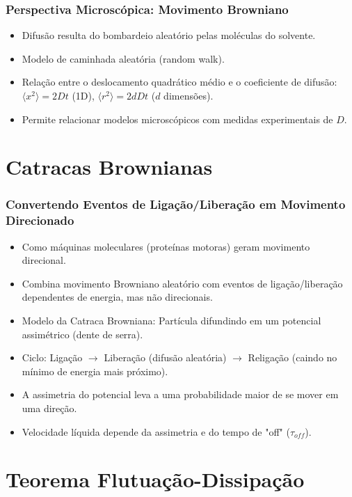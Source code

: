 \documentclass[11pt]{beamer}
\begin{document}
\begin{frame}
    \frametitle{Perspectiva Microscópica: Movimento Browniano}
    \begin{itemize}
        \item Difusão resulta do bombardeio aleatório pelas moléculas do solvente.
        \item Modelo de caminhada aleatória (random walk).
        \item Relação entre o deslocamento quadrático médio e o coeficiente de difusão: $\langle x^2 \rangle = 2Dt$ (1D), $\langle r^2 \rangle = 2dDt$ ($d$ dimensões).
        \item Permite relacionar modelos microscópicos com medidas experimentais de $D$.
    \end{itemize}
\end{frame}

\section{Catracas Brownianas}

\begin{frame}
    \frametitle{Convertendo Eventos de Ligação/Liberação em Movimento Direcionado}
    \begin{itemize}
        \item Como máquinas moleculares (proteínas motoras) geram movimento direcional.
        \item Combina movimento Browniano aleatório com eventos de ligação/liberação dependentes de energia, mas não direcionais.
        \item Modelo da Catraca Browniana: Partícula difundindo em um potencial assimétrico (dente de serra).
        \item Ciclo: Ligação $\rightarrow$ Liberação (difusão aleatória) $\rightarrow$ Religação (caindo no mínimo de energia mais próximo).
        \item A assimetria do potencial leva a uma probabilidade maior de se mover em uma direção.
        \item Velocidade líquida depende da assimetria e do tempo de "off" ($\tau_{off}$).
    \end{itemize}
\end{frame}

\section{Teorema Flutuação-Dissipação}
\end{document}

